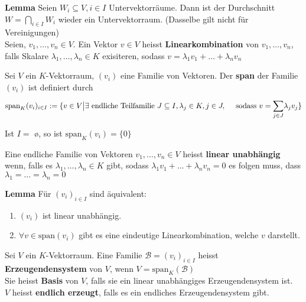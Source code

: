 \textbf{Lemma} Seien $W_i \subseteq V, i \in I$ Untervektorräume. Dann ist der Durchschnitt $W  = \underset{i \in I}{\bigcap} W_i$ wieder ein Untervektorraum. (Dasselbe gilt nicht für Vereinigungen)\\
Seien, $v_1, \ldots, v_n \in V$. Ein Vektor $v \in V$ heisst \textbf{Linearkombination} von $v_1, \ldots, v_n$, falls Skalare $\lambda_1, \ldots, \lambda_n \in K$ exisiteren, sodass $v = \lambda_{1} v_{1} + \ldots + \lambda_{n} v_{n}$\\
\begin{mdframed}
Sei $V$ ein $K$-Vektorraum, $(v_i)$ eine Familie von Vektoren. 
Der \textbf{span} der Familie $(v_i)$ ist definiert durch
\begin{align*}
   \text{span}_K(v_i)_{i \in I} := \{v \in V \big\vert \exists \text{ endliche Teilfamilie } J \subseteq I, \lambda_j \in K, j \in J, \quad \text{ sodass } v = \underset{j \in J}{\overset{}{\sum}} \lambda_j v_j\} 
\end{align*}
\end{mdframed}
Ist $I =$ \o, so ist $\text{span}_K(v_i) = \{0\}$\\
\begin{mdframed}
Eine endliche Familie von Vektoren $v_1, \ldots, v_n \in V$ heisst \textbf{linear unabhängig} wenn, falls es $\lambda_1, \ldots, \lambda_n \in K$ gibt, sodass $\lambda_{1} v_{1} + \ldots + \lambda_{n} v_{n} = 0$ es folgen muss, dass $\lambda_1 = \ldots = \lambda_n = 0$ 
\end{mdframed}
\textbf{Lemma} Für $(v_i)_{i\in I}$ sind äquivalent:
\begin{enumerate}[{(}i{)}]
    \item $(v_i)$ ist linear unabhängig.
    
    \item $\forall v \in \text{span}(v_i)$ gibt es eine eindeutige Linearkombination, welche $v$ darstellt.
\end{enumerate}
\begin{mdframed}
Sei $V$ ein $K$-Vektorraum. Eine Familie $\mathcal{B} = (v_i)_{i \in I}$ heisst \textbf{Erzeugendensystem} von $V$, wenn $V = \text{span}_K(\mathcal{B})$\\
Sie heisst \textbf{Basis} von $V$, falls sie ein linear unabhängiges Erzeugendensystem ist.\\
$V$ heisst \textbf{endlich erzeugt}, falls es ein endliches Erzeugendensystem gibt.
\end{mdframed}
